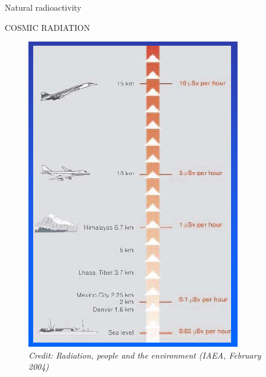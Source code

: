 \begin{frame}{Natural radioactivity}

\centering
\alert{COSMIC RADIATION}

\begin{figure}
\centering
\includegraphics[scale=0.5]{figures/20160220_rsw_cosmicrad.png}
\caption*{\emph{Credit: Radiation, people and the environment (IAEA, February 2004)}}
\end{figure}

\end{frame}

